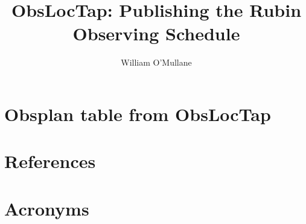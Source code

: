 \documentclass[DM,lsstdraft,authoryear,toc]{lsstdoc}
\title{ObsLocTap: Publishing the Rubin Observing Schedule}
\author{%
William O'Mullane
}
\date{\vcsDate}
\begin{document}
\mkshorttitle




\appendix
\section{Obsplan table from ObsLocTap} \label{sec:obsplan}

\section{References} \label{sec:bib}
\renewcommand{\refname}{} %


\section{Acronyms} \label{sec:acronyms}

\end{document}
